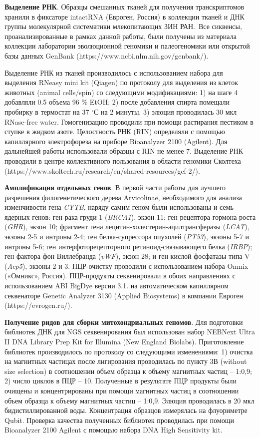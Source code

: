\textbf{Выделение РНК}. Образцы смешанных тканей для получения транскриптомов хранили в фиксаторе intactRNA (Евроген, Россия) в коллекции тканей и ДНК группы молекулярной систематики млекопитающих ЗИН РАН. Все сиквенсы, проанализированные в рамках данной работы, были получены из материала коллекции лаборатории эволюционной геномики и палеогеномики или открытой базы данных GenBank (https://www.ncbi.nlm.nih.gov/genbank/).

Выделение РНК из тканей производилось с использованием набора для выделения RNeasy mini kit (Qiagen) по протоколу для выделения из клеток животных (animal cells/spin) со следующими модификациями: 1) на шаге 4 добавляли 0.5 объема 96 \% EtOH; 2) после добавления спирта помещали пробирку в термостат на 37 $^\circ$С на 2 минуты, 3) элюция проводилась 30 мкл RNase-free water. Гомогенизацию проводили при помощи растирания пестиком в ступке в жидком азоте. Целостность РНК (RIN) определяли с помощью капиллярного электрофореза на приборе Bioanalyzer 2100 (Agilent). Для дальнейшей работы использовали образцы с RIN не менее 7. Выделение РНК проводили в центре коллективного пользования в области геномики Сколтеха (https://www.skoltech.ru/research/en/shared-resources/gcf-2/).


\textbf{Амплификация отдельных генов}. В первой части работы для лучшего разрешения филогенетического дерева Arvicolinae, необходимого для анализа изменчивости гена \textit{CYTB}, наряду самим геном были использованы и семь ядерных генов: ген рака груди 1 (\textit{BRCA1}), экзон 11; ген рецептора гормона роста (\textit{GHR}), экзон 10; фрагмент гена лецитин-холестерин-ацилтрансферазы (\textit{LCAT}), экзоны 2-5 и интроны 2-4; ген белка-супрессора опухолей (\textit{PT53}), экзоны 5-7 и интроны 5-6; ген интерфоторецепторного ретиноид-связывающего белка (\textit{IRBP}); ген фактора фон Виллебранда (\textit{vWF}), экзон 28; и ген кислой фосфатазы типа V (\textit{Acp5}), экзоны 2 и 3. ПЦР-очистку проводили с использованием набора Omnix («Омникс», Россия). ПЦР-продукты секвенировали в обоих направлениях с использованием ABI BigDye версии 3.1. на автоматическом капиллярном секвенаторе Genetic Analyzer 3130 (Applied Biosystems) в компании Евроген (https://evrogen.ru/). 

\textbf{Получение ридов для сборки митохондриальных геномов}. Для подготовки библиотек ДНК для NGS секвенирования был использован набор NEBNext Ultra II DNA Library Prep Kit for Illumina (New England Biolabs). Приготовление библиотек производилось по протоколу со следующими изменениями: 1)  очистка на магнитных частицах после лигирования проводилась по пункту 3В (without size selection) в соотношении объем образца к объему магнитных частиц -- 1:0,9; 2) число циклов в ПЦР -- 10.
Полученные в результате ПЦР продукты были очищены и концентрированы при помощи магнитных частиц в соотношении объем образца к объему магнитных частиц -- 1:0,9. Элюция проводилась в 20 мкл бидистиллированной воды. Концентрация образцов измерялась на флуориметре Qubit.
Проверка качества полученных библиотек проводилась при помощи Bioanalyzer 2100 Agilent с помощью набора DNA High Sensitivity kit.


